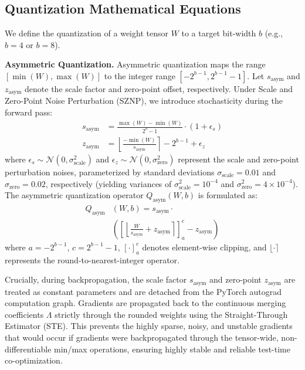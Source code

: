 \subsection{Quantization Mathematical Equations}
We define the quantization of a weight tensor $W$ to a target bit-width $b$ (e.g., $b = 4$ or $b = 8$).

\textbf{Asymmetric Quantization.}
Asymmetric quantization maps the range $[\min(W), \max(W)]$ to the integer range $[-2^{b-1}, 2^{b-1}-1]$. Let $s_{\text{asym}}$ and $z_{\text{asym}}$ denote the scale factor and zero-point offset, respectively. Under Scale and Zero-Point Noise Perturbation (SZNP), we introduce stochasticity during the forward pass:
\begin{align}
    s_{\text{asym}} &= \frac{\max(W) - \min(W)}{2^b - 1} \cdot (1 + \epsilon_s) \\
    z_{\text{asym}} &= \left\lfloor \frac{-\min(W)}{s_{\text{asym}}} \right\rceil - 2^{b-1} + \epsilon_z
\end{align}
where $\epsilon_s \sim \mathcal{N}(0, \sigma^2_{\text{scale}})$ and $\epsilon_z \sim \mathcal{N}(0, \sigma^2_{\text{zero}})$ represent the scale and zero-point perturbation noises, parameterized by standard deviations $\sigma_{\text{scale}} = 0.01$ and $\sigma_{\text{zero}} = 0.02$, respectively (yielding variances of $\sigma^2_{\text{scale}} = 10^{-4}$ and $\sigma^2_{\text{zero}} = 4 \times 10^{-4}$). The asymmetric quantization operator $Q_{\text{asym}}(W, b)$ is formulated as:
\begin{equation}
\begin{aligned}
    Q_{\text{asym}}&(W, b) = s_{\text{asym}} \cdot \\
    &\left( \left[ \left\lfloor \frac{W}{s_{\text{asym}}} + z_{\text{asym}} \right\rceil \right]_{a}^{c} - z_{\text{asym}} \right)
\end{aligned}
\end{equation}
where $a = -2^{b-1}$, $c = 2^{b-1} - 1$, $[\cdot]_{a}^{c}$ denotes element-wise clipping, and $\lfloor \cdot \rceil$ represents the round-to-nearest-integer operator.

Crucially, during backpropagation, the scale factor $s_{\text{asym}}$ and zero-point $z_{\text{asym}}$ are treated as constant parameters and are detached from the PyTorch autograd computation graph. Gradients are propagated back to the continuous merging coefficients $\Lambda$ strictly through the rounded weights using the Straight-Through Estimator (STE). This prevents the highly sparse, noisy, and unstable gradients that would occur if gradients were backpropagated through the tensor-wide, non-differentiable min/max operations, ensuring highly stable and reliable test-time co-optimization.

